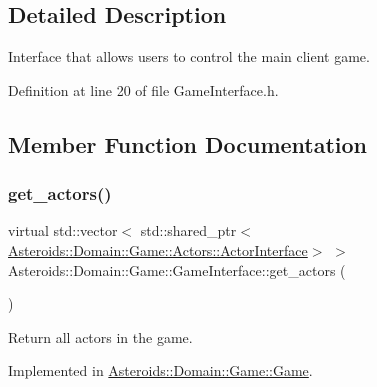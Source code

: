 \subsection{Detailed Description}
Interface that allows users to control the main client game. 

Definition at line 20 of file Game\+Interface.\+h.



\subsection{Member Function Documentation}
\mbox{\label{classAsteroids_1_1Domain_1_1Game_1_1GameInterface_af5bd347cdac153a538ad7d88e3473693}} 
\subsubsection{\texorpdfstring{get\+\_\+actors()}{get\_actors()}}
{\footnotesize\ttfamily virtual std\+::vector$<$ std\+::shared\+\_\+ptr$<$\hyperlink{classAsteroids_1_1Domain_1_1Game_1_1Actors_1_1ActorInterface}{Asteroids\+::\+Domain\+::\+Game\+::\+Actors\+::\+Actor\+Interface}$>$ $>$ Asteroids\+::\+Domain\+::\+Game\+::\+Game\+Interface\+::get\+\_\+actors (\begin{DoxyParamCaption}{ }\end{DoxyParamCaption})\hspace{0.3cm}{\ttfamily [pure virtual]}}



Return all actors in the game. 



Implemented in \hyperlink{classAsteroids_1_1Domain_1_1Game_1_1Game_af6a7d82ef71615d83aba515a07487641}{Asteroids\+::\+Domain\+::\+Game\+::\+Game}.

\mbox{\label{classAsteroids_1_1Domain_1_1Game_1_1GameInterface_a27ad37addb00549ed5123b128edf8edb}} 
